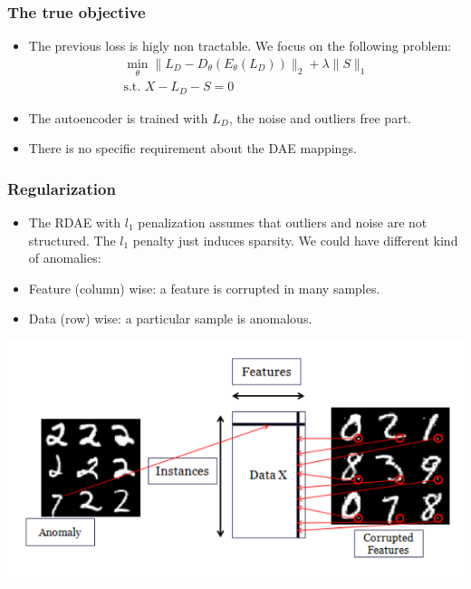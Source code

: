 \documentclass{beamer}
\theoremstyle{plain}
\theoremstyle{definition}
\theoremstyle{remark}
\newcommand{\norm}[1]{\lVert#1\rVert}
\begin{document}
	
\begin{frame}
	\frametitle{The true objective}
	\begin{itemize}
		\item The previous loss is higly non tractable. We focus on the following problem:
			\begin{align}
				\min_{\theta}{\norm{L_D -D_{\theta}(E_{\theta}(L_D))}_2 + \lambda\norm{S}_1}\\
				\text{s.t. }X-L_D-S=0  
			\end{align}
		\item The autoencoder is trained with $L_D$, the noise and outliers free part.
		\item There is no specific requirement about the DAE mappings.
	\end{itemize}
\end{frame}

\begin{frame}
	\frametitle{Regularization}
	\begin{itemize}
		\item The RDAE with $l_1$ penalization assumes that outliers and noise are not structured. The $l_1$ penalty just induces sparsity. We could have different kind of anomalies:
		\item Feature (column) wise: a feature is corrupted in many samples.
		\item Data (row) wise: a particular sample is anomalous. 
	\end{itemize}
\end{frame}

\begin{frame}
	\centering
	\includegraphics[width=0.9\linewidth]{Images/diff_anomalies.png}
\end{frame}
\end{document}
